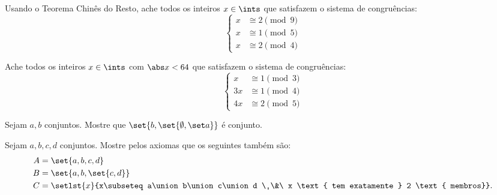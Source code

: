 \begin{exercise}
    Usando o Teorema Chinês do Resto, ache todos os inteiros $x\in\ints$ que satisfazem o sistema de congruências:
    $$
    \left\{
        \begin{aligned}
            x&\cong 2\pmod 9\\
            x&\cong 1\pmod 5\\
            x&\cong 2\pmod 4
        \end{aligned}
    \right.
    $$
\end{exercise}

\begin{exercise}
    Ache todos os inteiros $x\in\ints$ com $\abs x < 64$ que satisfazem o sistema de congruências:
    $$
    \left\{
        \begin{aligned}
            x &\cong 1\pmod 3\\
            3x&\cong 1\pmod 4\\
            4x&\cong 2\pmod 5
        \end{aligned}
    \right.
    $$
\end{exercise}

\begin{exercise}
	Sejam $a,b$ conjuntos. Mostre que $\set {b, \set {\emptyset, {\set a}}}$ é conjunto.
\end{exercise}

\begin{exercise}
	Sejam $a,b,c,d$ conjuntos. Mostre pelos axiomas que os seguintes também são:
	$$
	\begin{aligned}
		A &= \set {a, b, c, d}\\
		B &= \set {a, b, \set {c, d}}\\
		C &= \setlst {x} {x\subseteq a\union b\union c\union d \ \&\ x \text{ tem exatamente } 2 \text { membros}}.
	\end{aligned}
	$$
\end{exercise}
